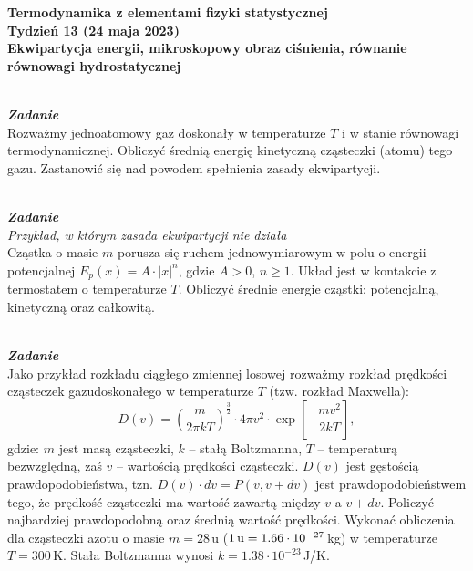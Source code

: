 \documentclass[11pt,a4paper]{article}
\newcounter{zadanie}\newcommand{\zadanie}[1][]{\addtocounter{zadanie}{1} ~\\  {\bf \emph{Zadanie \arabic{zadanie} #1 }} \\}
\begin{document}
\begin{centering}
\bf{\Large{Termodynamika z elementami fizyki statystycznej}}\\
Tydzień 13 (24 maja 2023)\\[5mm]
Ekwipartycja energii, mikroskopowy obraz ciśnienia, równanie równowagi hydrostatycznej\\
\end{centering}
\vspace{10mm}


\zadanie
Rozważmy jednoatomowy gaz doskonały w temperaturze $T$ i w stanie równowagi termodynamicznej.
Obliczyć średnią energię kinetyczną cząsteczki (atomu) tego gazu.
Zastanowić się nad powodem spełnienia zasady ekwipartycji.
\newline




\zadanie
{\em Przykład, w którym zasada ekwipartycji nie działa}\\
Cząstka o masie $m$ porusza się ruchem jednowymiarowym w polu o energii potencjalnej
$E_p(x) = A \cdot |x|^n$, gdzie $A>0$, $n\ge 1$.
Układ jest w kontakcie z termostatem o temperaturze $T$.
Obliczyć średnie energie cząstki: potencjalną, kinetyczną oraz całkowitą.
\newline




\zadanie
Jako przykład rozkładu ciągłego zmiennej losowej rozważmy
rozkład prędkości cząsteczek gazu\linebreak doskonałego w temperaturze $T$
(tzw. rozkład Maxwella):
\[ D(v) = \left(\frac{m}{2\pi k T}\right)^{\frac{3}{2}}
          \cdot 4 \pi v^2 \cdot\exp\left[ -\frac{m v^2}{2 k T} \right],\]
gdzie: $m$ jest masą cząsteczki, $k$ – stałą Boltzmanna, $T$ – temperaturą bezwzględną, zaś $v$ – wartością prędkości cząsteczki.
$D(v)$ jest gęstością prawdopodobieństwa, tzn. $D(v)\cdot dv = P(v, v+dv)$ jest prawdopodobieństwem tego, że prędkość cząsteczki ma wartość zawartą między
$v$ a $v+dv$. Policzyć najbardziej prawdopodobną oraz średnią wartość prędkości. Wykonać obliczenia dla cząsteczki azotu o masie $m = 28\,$u ($1\,{\rm u} = 1.66\cdot 10^{-27}\,$kg) w temperaturze $T = 300\,$K.
Stała Boltzmanna wynosi $k = 1.38\cdot 10^{-23}\,$J/K.
\newline
\end{document}
